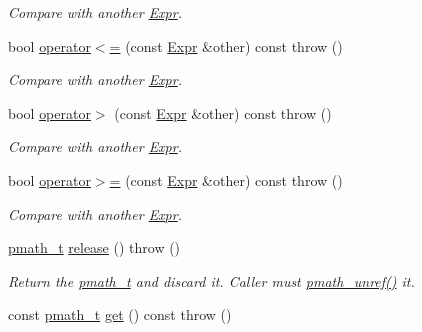 \begin{CompactItemize}
\begin{CompactList}\small\item\em Compare with another \hyperlink{classpmath_1_1_expr}{Expr}. \item\end{CompactList}\item 
\hypertarget{classpmath_1_1_expr_785d69ac72b09562ab6b78d21c464a85}{
bool \hyperlink{classpmath_1_1_expr_785d69ac72b09562ab6b78d21c464a85}{operator$<$=} (const \hyperlink{classpmath_1_1_expr}{Expr} \&other) const   throw ()}
\label{classpmath_1_1_expr_785d69ac72b09562ab6b78d21c464a85}

\begin{CompactList}\small\item\em Compare with another \hyperlink{classpmath_1_1_expr}{Expr}. \item\end{CompactList}\item 
\hypertarget{classpmath_1_1_expr_63ac68fea61b3e06ff1a9728de821b89}{
bool \hyperlink{classpmath_1_1_expr_63ac68fea61b3e06ff1a9728de821b89}{operator$>$} (const \hyperlink{classpmath_1_1_expr}{Expr} \&other) const   throw ()}
\label{classpmath_1_1_expr_63ac68fea61b3e06ff1a9728de821b89}

\begin{CompactList}\small\item\em Compare with another \hyperlink{classpmath_1_1_expr}{Expr}. \item\end{CompactList}\item 
\hypertarget{classpmath_1_1_expr_ea28afe6f7ce70c6a340441c89818433}{
bool \hyperlink{classpmath_1_1_expr_ea28afe6f7ce70c6a340441c89818433}{operator$>$=} (const \hyperlink{classpmath_1_1_expr}{Expr} \&other) const   throw ()}
\label{classpmath_1_1_expr_ea28afe6f7ce70c6a340441c89818433}

\begin{CompactList}\small\item\em Compare with another \hyperlink{classpmath_1_1_expr}{Expr}. \item\end{CompactList}\item 
\hypertarget{classpmath_1_1_expr_6cdd6385433ad4df3bb64af2fe865df7}{
\hyperlink{classpmath__t}{pmath\_\-t} \hyperlink{classpmath_1_1_expr_6cdd6385433ad4df3bb64af2fe865df7}{release} ()  throw ()}
\label{classpmath_1_1_expr_6cdd6385433ad4df3bb64af2fe865df7}

\begin{CompactList}\small\item\em Return the \hyperlink{classpmath__t}{pmath\_\-t} and discard it. Caller must \hyperlink{classpmath__t_54e905402c38940687033b87eb8c6c9f}{pmath\_\-unref()} it. \item\end{CompactList}\item 
\hypertarget{classpmath_1_1_expr_85d5a834d389ae9a20d8a29d9512ef5b}{
const \hyperlink{classpmath__t}{pmath\_\-t} \hyperlink{classpmath_1_1_expr_85d5a834d389ae9a20d8a29d9512ef5b}{get} () const   throw ()}
\label{classpmath_1_1_expr_85d5a834d389ae9a20d8a29d9512ef5b}


\end{CompactItemize}
